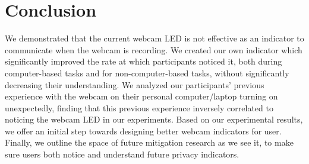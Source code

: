 \documentclass{sigchi}
\begin{document}





\section{Conclusion}
We demonstrated that the current webcam LED is not effective as an indicator to communicate when the webcam is recording. We created our own indicator which significantly improved the rate at which participants noticed it, both during computer-based tasks and for non-computer-based tasks, without significantly decreasing their understanding. We analyzed our participants' previous experience with the webcam on their personal computer/laptop turning on unexpectedly, finding that this previous experience inversely correlated to noticing the webcam LED in our experiments. Based on our experimental results, we offer an initial step towards designing better webcam indicators for user. Finally, we outline the space of future mitigation research as we see it, to make sure users both notice and understand future privacy indicators.
\end{document}
